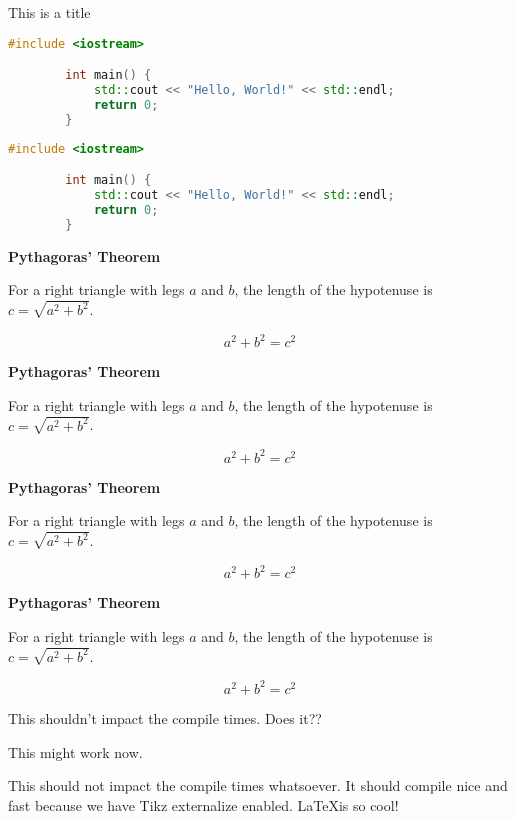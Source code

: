 \begin{codebox}{This is a title}
    \begin{lstlisting}[language=C++]
        #include <iostream>

        int main() {
            std::cout << "Hello, World!" << std::endl;
            return 0;
        }
    \end{lstlisting}
\end{codebox}

\begin{lstlisting}[language=C++]
        #include <iostream>

        int main() {
            std::cout << "Hello, World!" << std::endl;
            return 0;
        }
\end{lstlisting}

\begin{theorem}
    \textbf{Pythagoras' Theorem}

    For a right triangle with legs $a$ and $b$, the length of the hypotenuse is
    $c = \sqrt{a^2 + b^2}$.

    \begin{equation*}
        a^2 + b^2 = c^2
    \end{equation*}
\end{theorem}

\begin{lemma}
    \textbf{Pythagoras' Theorem}

    For a right triangle with legs $a$ and $b$, the length of the hypotenuse is
    $c = \sqrt{a^2 + b^2}$.

    \begin{equation*}
        a^2 + b^2 = c^2
    \end{equation*}
\end{lemma}

\begin{corollary}
    \textbf{Pythagoras' Theorem}

    For a right triangle with legs $a$ and $b$, the length of the hypotenuse is
    $c = \sqrt{a^2 + b^2}$.

    \begin{equation*}
        a^2 + b^2 = c^2
    \end{equation*}
\end{corollary}

\begin{proposition}
    \textbf{Pythagoras' Theorem}

    For a right triangle with legs $a$ and $b$, the length of the hypotenuse is
    $c = \sqrt{a^2 + b^2}$.

    \begin{equation*}
        a^2 + b^2 = c^2
    \end{equation*}
\end{proposition}

This shouldn't impact the compile times. Does it??

This might work now.

This should not impact the compile times whatsoever. It should compile nice and
fast because we have Tikz externalize enabled. \LaTeX is so cool!
